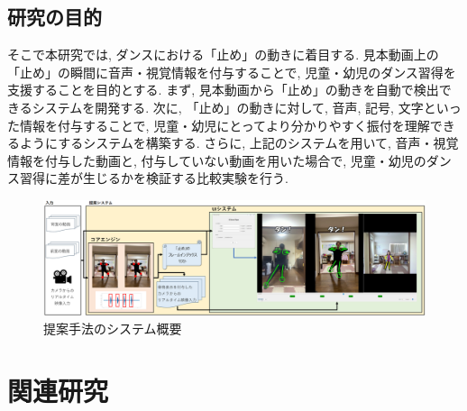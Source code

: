 \documentclass[technicalreport]{ieicej}
\begin{document}
\subsection{研究の目的}
そこで本研究では, ダンスにおける「止め」の動きに着目する. 見本動画上の「止め」の瞬間に音声・視覚情報を付与することで, 児童・幼児のダンス習得を支援することを目的とする. まず, 見本動画から「止め」の動きを自動で検出できるシステムを開発する. 次に, 「止め」の動きに対して, 音声, 記号, 文字といった情報を付与することで, 児童・幼児にとってより分かりやすく振付を理解できるようにするシステムを構築する. さらに, 上記のシステムを用いて, 音声・視覚情報を付与した動画と, 付与していない動画を用いた場合で, 児童・幼児のダンス習得に差が生じるかを検証する比較実験を行う. 
\begin{figure}[t]  %
  \centering
  \includegraphics[width=\textwidth]{./images/summary.png}
  \caption{提案手法のシステム概要}
\end{figure}
\section{関連研究}
\end{document}
